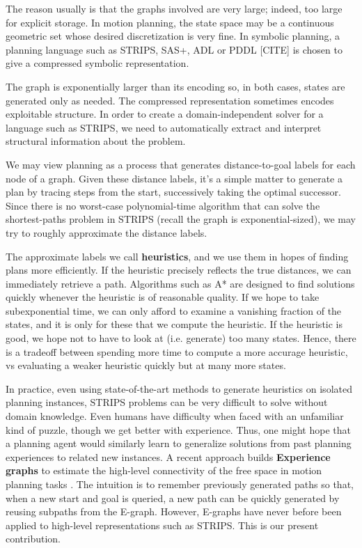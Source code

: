 \documentclass[letterpaper]{article}
\begin{document}
The reason usually is that the graphs involved are very large; indeed, too large for explicit storage.
In motion planning, the state space may be a continuous geometric set whose desired discretization is very fine.
In symbolic planning, a planning language such as STRIPS, SAS+, ADL or PDDL [CITE] is chosen to give a compressed symbolic representation.

The graph is exponentially larger than its encoding so, in both cases, states are generated only as needed.
The compressed representation sometimes encodes exploitable structure.
In order to create a domain-independent solver for a language such as STRIPS, we need to automatically extract and interpret structural information about the problem. 

We may view planning as a process that generates distance-to-goal labels for each node of a graph.
Given these distance labels, it's a simple matter to generate a plan by tracing steps from the start, successively taking the optimal successor.
Since there is no worst-case polynomial-time algorithm that can solve the shortest-paths problem in STRIPS (recall the graph is exponential-sized), we may try to roughly approximate the distance labels.

The approximate labels we call \textbf{heuristics}, and we use them in hopes of finding plans more efficiently.
If the heuristic precisely reflects the true distances, we can immediately retrieve a path.
Algorithms such as A* are designed to find solutions quickly whenever the heuristic is of reasonable quality.
If we hope to take subexponential time, we can only afford to examine a vanishing fraction of the states, and it is only for these that we compute the heuristic.
If the heuristic is good, we hope not to have to look at (i.e. generate) too many states.
Hence, there is a tradeoff between spending more time to compute a more accurage heuristic, vs evaluating a weaker heuristic quickly but at many more states.

In practice, even using state-of-the-art methods to generate heuristics on isolated planning instances, STRIPS problems can be very difficult to solve without domain knowledge.
Even humans have difficulty when faced with an unfamiliar kind of puzzle, though we get better with experience.
Thus, one might hope that a planning agent would similarly learn to generalize solutions from past planning experiences to related new instances.
A recent approach builds \textbf{Experience graphs} to estimate the high-level connectivity of the free space in motion planning tasks \cite{phillips2012graphs}.
The intuition is to remember previously generated paths so that, when a new start and goal is queried, a new path can be quickly generated by reusing subpaths from the E-graph.
However, E-graphs have never before been applied to high-level representations such as STRIPS. This is our present contribution.
\end{document}
